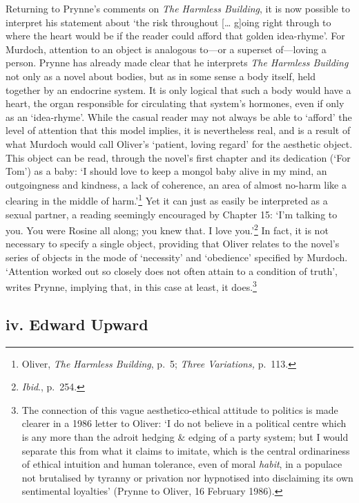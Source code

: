 \documentclass[]{article}
\begin{document}
Returning to Prynne’s comments on \emph{The Harmless Building}, it is
now possible to interpret his statement about ‘the risk throughout
{[}\ldots{} g{]}oing right through to where the heart would be if the
reader could afford that golden idea-rhyme’. For Murdoch, attention to
an object is analogous to—or a superset of—loving a person. Prynne has
already made clear that he interprets \emph{The Harmless Building} not
only as a novel about bodies, but as in some sense a body itself, held
together by an endocrine system. It is only logical that such a body
would have a heart, the organ responsible for circulating that system’s
hormones, even if only as an ‘idea-rhyme’. While the casual reader may
not always be able to ‘afford’ the level of attention that this model
implies, it is nevertheless real, and is a result of what Murdoch would
call Oliver’s ‘patient, loving regard’ for the aesthetic object. This
object can be read, through the novel’s first chapter and its dedication
(‘For Tom’) as a baby: ‘I should love to keep a mongol baby alive in my
mind, an outgoingness and kindness, a lack of coherence, an area of
almost no-harm like a clearing in the middle of harm.’\footnote{Oliver,
  \emph{The Harmless Building}, p.~5; \emph{Three Variations,} p.~113.}
Yet it can just as easily be interpreted as a sexual partner, a reading
seemingly encouraged by Chapter 15: ‘I’m talking to you. You were Rosine
all along; you knew that. I love you.’\footnote{\emph{Ibid}., p.~254.}
In fact, it is not necessary to specify a single object, providing that
Oliver relates to the novel’s series of objects in the mode of
‘necessity’ and ‘obedience’ specified by Murdoch. ‘Attention worked out
so closely does not often attain to a condition of truth’, writes
Prynne, implying that, in this case at least, it does.\footnote{The
  connection of this vague aesthetico-ethical attitude to politics is
  made clearer in a 1986 letter to Oliver: ‘I do not believe in a
  political centre which is any more than the adroit hedging \& edging
  of a party system; but I would separate this from what it claims to
  imitate, which is the central ordinariness of ethical intuition and
  human tolerance, even of moral \emph{habit}, in a populace not
  brutalised by tyranny or privation nor hypnotised into disclaiming its
  own sentimental loyalties’ (Prynne to Oliver, 16 February 1986).}

\subsection{iv. Edward Upward}\label{iv.-edward-upward}
\end{document}
